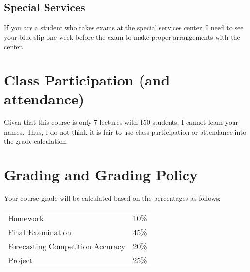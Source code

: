 \documentclass[12pt]{article}
\newcommand{\qu}[1]{``#1''}
\begin{document}
%


%

\subsection*{Special Services}

If you are a student who takes exams at the special services center, I need to see your blue slip one week before the exam to make proper arrangements with the center.

\section*{Class Participation (and attendance)}

Given that this course is only 7 lectures with 150 students, I cannot learn your names. Thus, I do not think it is fair to use class participation or attendance into the grade calculation.


\section*{Grading and Grading Policy}\label{sec:grading}

Your course grade will be calculated based on the percentages as follows: 

\begin{table}[htp]
\centering
\begin{tabular}{l|l}
Homework & 10\% \\
Final Examination & 45\% \\
Forecasting Competition Accuracy & 20\% \\
Project & 25\%
\end{tabular}
\end{table}
\FloatBarrier
\end{document}
